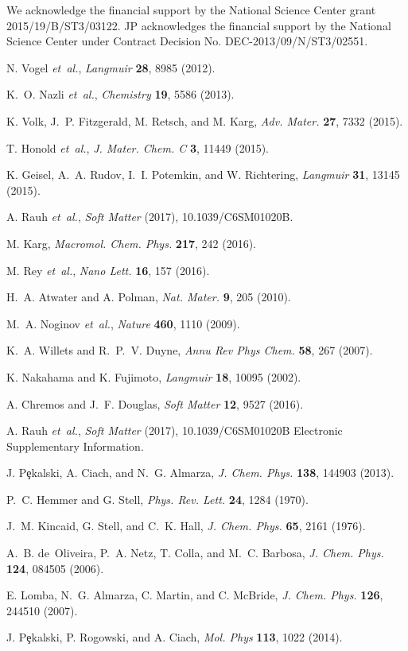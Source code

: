 \documentclass[preprint,
prl,%
aps]{revtex4}
\begin{document}
We acknowledge the financial support by the National Science Center grant  2015/19/B/ST3/03122. 
JP acknowledges the financial support by the National Science Center under Contract Decision No. DEC-2013/09/N/ST3/02551.
 \begin{thebibliography}{10}

N. Vogel {\it et~al.}, {\it Langmuir} {\bf 28},  8985  (2012).

K.~O. Nazli {\it et~al.}, {\it Chemistry} {\bf 19},  5586  (2013).

K. Volk, J.~P. Fitzgerald, M. Retsch, and M. Karg, {\it Adv. Mater. } {\bf 27},
   7332  (2015).

T. Honold {\it et~al.}, {\it J. Mater. Chem. C} {\bf 3},  11449  (2015).

K. Geisel, A.~A. Rudov, I.~I. Potemkin, and W. Richtering, {\it Langmuir} {\bf
  31},  13145  (2015).

A. Rauh {\it et~al.}, {\it Soft Matter}  (2017), 10.1039/C6SM01020B.

M. Karg, {\it Macromol. Chem. Phys.} {\bf 217},  242  (2016).

M. Rey {\it et~al.}, {\it Nano Lett.} {\bf 16},  157  (2016).

H.~A. Atwater and A. Polman, {\it Nat. Mater.} {\bf 9},  205  (2010).

M.~A. Noginov {\it et~al.}, {\it Nature} {\bf 460},  1110  (2009).

K.~A. Willets and R.~P.~V. Duyne, {\it Annu Rev Phys Chem.} {\bf 58},  267
  (2007).

K. Nakahama and K. Fujimoto, {\it Langmuir} {\bf 18},  10095  (2002).

A. Chremos and J.~F. Douglas, {\it Soft Matter} {\bf 12},  9527  (2016).

A. Rauh {\it et~al.}, {\it Soft Matter}  (2017), 10.1039/C6SM01020B Electronic
  Supplementary Information.

J. P{\c e}kalski, A. Ciach, and N.~G. Almarza, {\it J. Chem. Phys.} {\bf 138},
  144903  (2013).

P.~C. Hemmer and G. Stell, {\it Phys. Rev. Lett.} {\bf 24},  1284  (1970).

J.~M. Kincaid, G. Stell, and C.~K. Hall, {\it J. Chem. Phys.} {\bf 65},  2161
  (1976).

A.~B. de~Oliveira, P.~A. Netz, T. Colla, and M.~C. Barbosa, {\it J. Chem.
  Phys.} {\bf 124},  084505  (2006).

E. Lomba, N.~G. Almarza, C. Martin, and C. McBride, {\it J. Chem. Phys.} {\bf
  126},  244510  (2007).

J. P\c{e}kalski, P. Rogowski, and A. Ciach, {\it Mol. Phys} {\bf 113},  1022
  (2014).

\end{thebibliography}


% 
%
 
\end{document}
